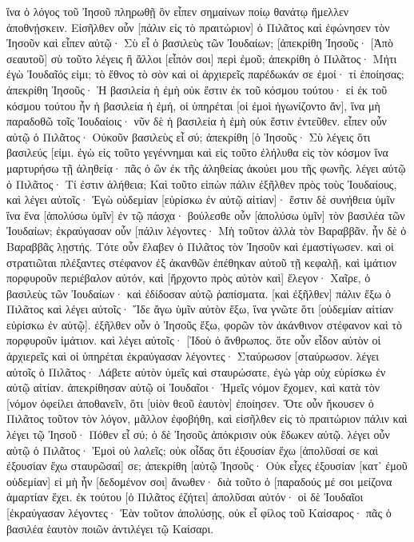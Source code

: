 ἵνα ὁ λόγος τοῦ Ἰησοῦ πληρωθῇ ὃν εἶπεν σημαίνων ποίῳ θανάτῳ ἤμελλεν ἀποθνῄσκειν. 
Εἰσῆλθεν οὖν [πάλιν εἰς τὸ πραιτώριον] ὁ Πιλᾶτος καὶ ἐφώνησεν τὸν Ἰησοῦν καὶ εἶπεν αὐτῷ· Σὺ εἶ ὁ βασιλεὺς τῶν Ἰουδαίων; 
[ἀπεκρίθη Ἰησοῦς· [Ἀπὸ σεαυτοῦ] σὺ τοῦτο λέγεις ἢ ἄλλοι [εἶπόν σοι] περὶ ἐμοῦ; 
ἀπεκρίθη ὁ Πιλᾶτος· Μήτι ἐγὼ Ἰουδαῖός εἰμι; τὸ ἔθνος τὸ σὸν καὶ οἱ ἀρχιερεῖς παρέδωκάν σε ἐμοί· τί ἐποίησας; 
ἀπεκρίθη Ἰησοῦς· Ἡ βασιλεία ἡ ἐμὴ οὐκ ἔστιν ἐκ τοῦ κόσμου τούτου· εἰ ἐκ τοῦ κόσμου τούτου ἦν ἡ βασιλεία ἡ ἐμή, οἱ ὑπηρέται [οἱ ἐμοὶ ἠγωνίζοντο ἄν], ἵνα μὴ παραδοθῶ τοῖς Ἰουδαίοις· νῦν δὲ ἡ βασιλεία ἡ ἐμὴ οὐκ ἔστιν ἐντεῦθεν. 
εἶπεν οὖν αὐτῷ ὁ Πιλᾶτος· Οὐκοῦν βασιλεὺς εἶ σύ; ἀπεκρίθη [ὁ Ἰησοῦς· Σὺ λέγεις ὅτι βασιλεύς [εἰμι. ἐγὼ εἰς τοῦτο γεγέννημαι καὶ εἰς τοῦτο ἐλήλυθα εἰς τὸν κόσμον ἵνα μαρτυρήσω τῇ ἀληθείᾳ· πᾶς ὁ ὢν ἐκ τῆς ἀληθείας ἀκούει μου τῆς φωνῆς. 
λέγει αὐτῷ ὁ Πιλᾶτος· Τί ἐστιν ἀλήθεια; Καὶ τοῦτο εἰπὼν πάλιν ἐξῆλθεν πρὸς τοὺς Ἰουδαίους, καὶ λέγει αὐτοῖς· Ἐγὼ οὐδεμίαν [εὑρίσκω ἐν αὐτῷ αἰτίαν]· 
ἔστιν δὲ συνήθεια ὑμῖν ἵνα ἕνα [ἀπολύσω ὑμῖν] ἐν τῷ πάσχα· βούλεσθε οὖν [ἀπολύσω ὑμῖν] τὸν βασιλέα τῶν Ἰουδαίων; 
ἐκραύγασαν οὖν [πάλιν λέγοντες· Μὴ τοῦτον ἀλλὰ τὸν Βαραββᾶν. ἦν δὲ ὁ Βαραββᾶς λῃστής. 
Τότε οὖν ἔλαβεν ὁ Πιλᾶτος τὸν Ἰησοῦν καὶ ἐμαστίγωσεν. 
καὶ οἱ στρατιῶται πλέξαντες στέφανον ἐξ ἀκανθῶν ἐπέθηκαν αὐτοῦ τῇ κεφαλῇ, καὶ ἱμάτιον πορφυροῦν περιέβαλον αὐτόν, 
καὶ [ἤρχοντο πρὸς αὐτὸν καὶ] ἔλεγον· Χαῖρε, ὁ βασιλεὺς τῶν Ἰουδαίων· καὶ ἐδίδοσαν αὐτῷ ῥαπίσματα. 
[καὶ ἐξῆλθεν] πάλιν ἔξω ὁ Πιλᾶτος καὶ λέγει αὐτοῖς· Ἴδε ἄγω ὑμῖν αὐτὸν ἔξω, ἵνα γνῶτε ὅτι [οὐδεμίαν αἰτίαν εὑρίσκω ἐν αὐτῷ]. 
ἐξῆλθεν οὖν ὁ Ἰησοῦς ἔξω, φορῶν τὸν ἀκάνθινον στέφανον καὶ τὸ πορφυροῦν ἱμάτιον. καὶ λέγει αὐτοῖς· [Ἰδοὺ ὁ ἄνθρωπος. 
ὅτε οὖν εἶδον αὐτὸν οἱ ἀρχιερεῖς καὶ οἱ ὑπηρέται ἐκραύγασαν λέγοντες· Σταύρωσον [σταύρωσον. λέγει αὐτοῖς ὁ Πιλᾶτος· Λάβετε αὐτὸν ὑμεῖς καὶ σταυρώσατε, ἐγὼ γὰρ οὐχ εὑρίσκω ἐν αὐτῷ αἰτίαν. 
ἀπεκρίθησαν αὐτῷ οἱ Ἰουδαῖοι· Ἡμεῖς νόμον ἔχομεν, καὶ κατὰ τὸν [νόμον ὀφείλει ἀποθανεῖν, ὅτι [υἱὸν θεοῦ ἑαυτὸν] ἐποίησεν. 
Ὅτε οὖν ἤκουσεν ὁ Πιλᾶτος τοῦτον τὸν λόγον, μᾶλλον ἐφοβήθη, 
καὶ εἰσῆλθεν εἰς τὸ πραιτώριον πάλιν καὶ λέγει τῷ Ἰησοῦ· Πόθεν εἶ σύ; ὁ δὲ Ἰησοῦς ἀπόκρισιν οὐκ ἔδωκεν αὐτῷ. 
λέγει οὖν αὐτῷ ὁ Πιλᾶτος· Ἐμοὶ οὐ λαλεῖς; οὐκ οἶδας ὅτι ἐξουσίαν ἔχω [ἀπολῦσαί σε καὶ ἐξουσίαν ἔχω σταυρῶσαί] σε; 
ἀπεκρίθη [αὐτῷ Ἰησοῦς· Οὐκ εἶχες ἐξουσίαν [κατ᾽ ἐμοῦ οὐδεμίαν] εἰ μὴ ἦν [δεδομένον σοι] ἄνωθεν· διὰ τοῦτο ὁ [παραδούς μέ σοι μείζονα ἁμαρτίαν ἔχει. 
ἐκ τούτου [ὁ Πιλᾶτος ἐζήτει] ἀπολῦσαι αὐτόν· οἱ δὲ Ἰουδαῖοι [ἐκραύγασαν λέγοντες· Ἐὰν τοῦτον ἀπολύσῃς, οὐκ εἶ φίλος τοῦ Καίσαρος· πᾶς ὁ βασιλέα ἑαυτὸν ποιῶν ἀντιλέγει τῷ Καίσαρι. 
